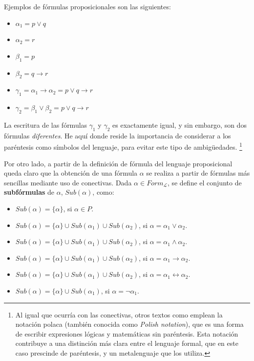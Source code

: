 \noindent
Ejemplos de fórmulas proposicionales son las siguientes:
\begin{itemize}
    \item $\alpha_1 = p \lor q$
    \item $\alpha_2 = r$
    \item $\beta_1 = p$
    \item $\beta_2 = q \rightarrow r$

    \item $\gamma_1 = \alpha_1 \rightarrow \alpha_2 = p \lor q \rightarrow r$
    \item $\gamma_2 = \beta_1 \lor \beta_2 = p \lor q \rightarrow r$
\end{itemize}

La escritura de las fórmulas $\gamma_1$ y $\gamma_2$ es exactamente igual, y sin embargo, son dos fórmulas \textit{diferentes}. He aquí donde reside la importancia de considerar a los paréntesis como símbolos del lenguaje, para evitar este tipo de ambigüedades. \footnote{Al igual que ocurría con las conectivas, otros textos como \cite[Capítulo 8]{monk1976mathematical} emplean la notación polaca (también conocida como \textit{Polish notation}), que es una forma de escribir expresiones lógicas y matemáticas sin paréntesis. Esta notación contribuye a una distinción más clara entre el lenguaje formal, que en este caso prescinde de paréntesis, y un metalenguaje que los utiliza.} 

Por otro lado, a partir de la definición de fórmula del lenguaje proposicional queda claro que la obtención de una fórmula $\alpha$ se realiza a partir de fórmulas más sencillas mediante uso de conectivas. Dada $\alpha \in Form_{\mathcal{L}}$, se define el conjunto de \textbf{subfórmulas} de $\alpha$, $Sub(\alpha)$, como:

\begin{itemize}
    \item $Sub(\alpha) = \lbrace \alpha \rbrace$, si $\alpha \in P$.
    \item $Sub(\alpha) = \lbrace \alpha \rbrace \cup Sub(\alpha_1) \cup Sub(\alpha_2)$, si $\alpha = \alpha_1 \lor \alpha_2$.
    \item $Sub(\alpha) = \lbrace \alpha \rbrace \cup Sub(\alpha_1) \cup Sub(\alpha_2)$, si $\alpha = \alpha_1 \land \alpha_2$.
    \item $Sub(\alpha) = \lbrace \alpha \rbrace \cup Sub(\alpha_1) \cup Sub(\alpha_2)$, si $\alpha = \alpha_1 \rightarrow \alpha_2$.
    \item $Sub(\alpha) = \lbrace \alpha \rbrace \cup Sub(\alpha_1) \cup Sub(\alpha_2)$, si $\alpha = \alpha_1 \leftrightarrow \alpha_2$.
    \item $Sub(\alpha) = \lbrace \alpha \rbrace \cup Sub(\alpha_1)$, si $\alpha = \neg\alpha_1$.
\end{itemize}

